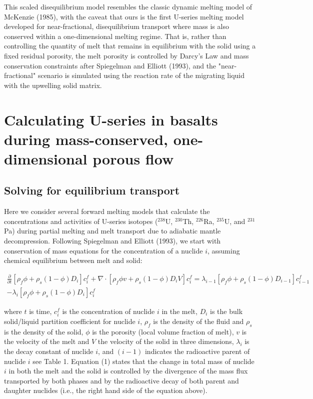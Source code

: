 \documentclass[draft]{agujournal2019}
\begin{document}
This scaled disequilibrium model resembles the classic dynamic melting model of McKenzie (1985), with the caveat that ours is the first U-series melting model developed for near-fractional, disequilibrium transport where mass is also conserved within a one-dimensional melting regime. That is, rather than controlling the quantity of melt that remains in equilibrium with the solid using a fixed residual porosity, the melt porosity is controlled by Darcy's Law and mass conservation constraints after Spiegelman and Elliott (1993), and the "near-fractional" scenario is simulated using the reaction rate of the migrating liquid with the upwelling solid matrix.


\section{Calculating U-series in basalts during mass-conserved, one-dimensional porous flow}

\subsection{Solving for equilibrium transport}

Here we consider several forward melting models that  calculate the concentrations and activities of U-series isotopes ($^{238}$U, $^{230}$Th, $^{226}$Ra, $^{235}$U, and $^{231}$Pa) during  partial melting and melt transport due to  adiabatic mantle decompression. Following Spiegelman and Elliott (1993), we start with conservation of mass equations for the concentration of a nuclide $i$, assuming chemical equilibrium between melt and solid:

\begin{linenomath*}
\begin{equation}\label{eq:1}
    \begin{aligned}
        \frac{\partial}{\partial t}[\rho_{f} \phi + \rho_{s}(1-\phi)D_i]c_{i}^f + \nabla \cdot [\rho_f \phi v + \rho_s (1 - \phi) D_i V] c_i^f = \lambda_{i-1}[\rho_f \phi + \rho_s (1-\phi) D_{i-1}]c_{i-1}^f \\
        - \lambda_{i}[\rho_f \phi + \rho_s (1-\phi) D_{i}]c_{i}^f
    \end{aligned}
\end{equation}
\end{linenomath*}

where $t$ is time, $c_i^f$ is the concentration of nuclide $i$ in the melt, $D_i$ is the bulk solid/liquid partition coefficient for nuclide $i$, $\rho_f$ is the density of the fluid and $\rho_s$ is the density of the solid, $\phi$ is the porosity (local volume fraction of melt), $v$ is the velocity of the melt and $V$ the velocity of the solid in three dimensions, $\lambda_i$ is the decay constant of nuclide $i$, and $(i-1)$ indicates the radioactive parent of nuclide $i$ see Table 1. Equation (1) states that the change in total mass of nuclide $i$ in both the melt and the solid is controlled by the divergence of the mass flux transported by both phases and by the radioactive decay of both parent and daughter nuclides (i.e., the right hand side of the equation above).
\end{document}
